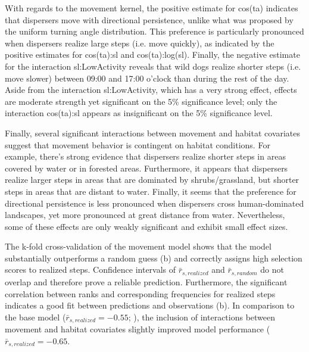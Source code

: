 \documentclass[abstract=on,10pt,a4paper,bibliography=totocnumbered]{article}
\begin{document}
With regards to the movement kernel, the positive estimate for \textsf{cos(ta)}
indicates that dispersers move with directional persistence, unlike what was
proposed by the uniform turning angle distribution. This preference is
particularly pronounced when dispersers realize large steps (i.e. move quickly),
as indicated by the positive estimates for \textsf{cos(ta):sl} and
\textsf{cos(ta):log(sl)}. Finally, the negative estimate for the interaction
\textsf{sl:LowActivity} reveals that wild dogs realize shorter steps (i.e. move
slower) between 09:00 and 17:00 o'clock than during the rest of the day. Aside
from the interaction \textsf{sl:LowActivity}, which has a very strong effect,
effects are moderate strength yet significant on the 5\% significance level;
only the interaction \textsf{cos(ta):sl} appears as insignificant on the 5\%
significance level.

Finally, several significant interactions between movement and habitat
covariates suggest that movement behavior is contingent on habitat conditions.
For example, there's strong evidence that dispersers realize shorter steps in
areas covered by water or in forested areas. Furthermore, it appears that
dispersers realize larger steps in areas that are dominated by shrubs/grassland,
but shorter steps in areas that are distant to water. Finally, it seems that the
preference for directional persistence is less pronounced when dispersers cross
human-dominated landscapes, yet more pronounced at great distance from water.
Nevertheless, some of these effects are only weakly significant and exhibit
small effect sizes.

The k-fold cross-validation of the movement model shows that the model
substantially outperforms a random guess (b) and correctly
assigns high selection scores to realized steps. Confidence intervals of
\(\bar{r}_{s, realized}\) and \(\bar{r}_{s, random}\) do not overlap and
therefore prove a reliable prediction. Furthermore, the significant correlation
between ranks and corresponding frequencies for realized steps indicates a good
fit between predictions and observations (b). In comparison
to the base model (\(\bar{r}_{s, realized} = -0.55\); \citealp{Hofmann.2021}),
the inclusion of interactions between movement and habitat covariates slightly
improved model performance (\(\bar{r}_{s, realized} = -0.65\).
\end{document}
